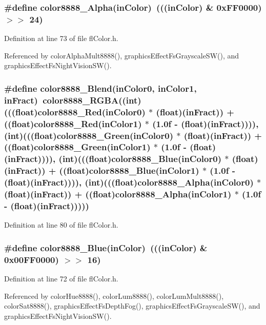 \subsubsection{\setlength{\rightskip}{0pt plus 5cm}\#define color8888\_\-Alpha(in\-Color)~(((in\-Color) \& 0x\-FF0000) $>$$>$ 24)}\label{flColor_8h_c52094d7ed85cc5e19c4222705757077}




Definition at line 73 of file fl\-Color.h.

Referenced by color\-Alpha\-Mult8888(), graphics\-Effect\-Fs\-Grayscale\-SW(), and graphics\-Effect\-Fs\-Night\-Vision\-SW().
\subsubsection{\setlength{\rightskip}{0pt plus 5cm}\#define color8888\_\-Blend(in\-Color0, in\-Color1, in\-Fract)~color8888\_\-RGBA((int)(((float)color8888\_\-Red(in\-Color0) $\ast$ (float)(in\-Fract)) + ((float)color8888\_\-Red(in\-Color1) $\ast$ (1.0f - (float)(in\-Fract)))), (int)(((float)color8888\_\-Green(in\-Color0) $\ast$ (float)(in\-Fract)) + ((float)color8888\_\-Green(in\-Color1) $\ast$ (1.0f - (float)(in\-Fract)))), (int)(((float)color8888\_\-Blue(in\-Color0) $\ast$ (float)(in\-Fract)) + ((float)color8888\_\-Blue(in\-Color1) $\ast$ (1.0f - (float)(in\-Fract)))), (int)(((float)color8888\_\-Alpha(in\-Color0) $\ast$ (float)(in\-Fract)) + ((float)color8888\_\-Alpha(in\-Color1) $\ast$ (1.0f - (float)(in\-Fract)))))}\label{flColor_8h_463c7064745285f1f35f0efdefa7e94e}




Definition at line 80 of file fl\-Color.h.
\subsubsection{\setlength{\rightskip}{0pt plus 5cm}\#define color8888\_\-Blue(in\-Color)~(((in\-Color) \& 0x00FF0000) $>$$>$ 16)}\label{flColor_8h_c09995ef6e65b29323f5514a08a9ce41}




Definition at line 72 of file fl\-Color.h.

Referenced by color\-Hue8888(), color\-Lum8888(), color\-Lum\-Mult8888(), color\-Sat8888(), graphics\-Effect\-Fs\-Depth\-Fog(), graphics\-Effect\-Fs\-Grayscale\-SW(), and graphics\-Effect\-Fs\-Night\-Vision\-SW().
